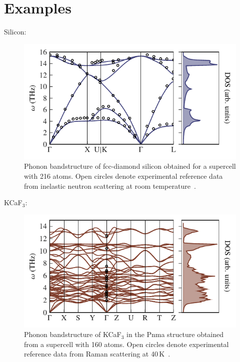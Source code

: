 \section{Examples}



Silicon:
\begin{figure}
	\includegraphics[width=\textwidth]{./data/plots/anharmonicity/3_bandstructures/Si/bands_dos_emb.pdf}
	\caption{
		Phonon bandstructure of fcc-diamond silicon obtained for a supercell with 216 atoms. Open circles denote experimental reference data from inelastic neutron scattering at room temperature~\cite{Nilsson1972}.
	}
\end{figure}

KCaF$_3$:
\begin{figure}
	\includegraphics[width=\textwidth]{./data/plots/anharmonicity/3_bandstructures/KCaF3/bands_dos_emb.pdf}
	\caption{
		Phonon bandstructure of KCaF$_3$ in the Pnma structure obtained from a supercell with 160 atoms. Open circles denote experimental reference data from Raman scattering at 40\,K~\cite{Daniel1997}.
	}
\end{figure}

